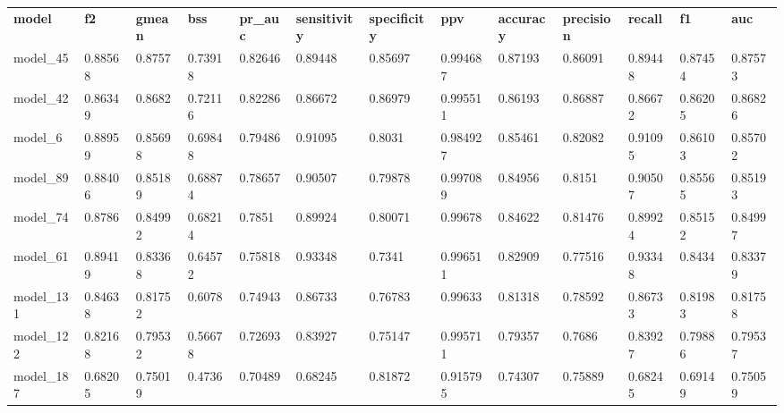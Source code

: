 \begin{tabular}{lllllllllllll}
\textbf{model} & \textbf{f2} & \textbf{gmean} & \textbf{bss} & \textbf{pr\_auc} & \textbf{sensitivity} & \textbf{specificity} & \textbf{ppv} & \textbf{accuracy} & \textbf{precision} & \textbf{recall} & \textbf{f1} & \textbf{auc} \\
model\_45      & 0.88568     & 0.8757         & 0.73918      & 0.82646          & 0.89448              & 0.85697              & 0.994687     & 0.87193           & 0.86091            & 0.89448         & 0.87454     & 0.87573      \\
model\_42      & 0.86349     & 0.8682         & 0.72116      & 0.82286          & 0.86672              & 0.86979              & 0.995511     & 0.86193           & 0.86887            & 0.86672         & 0.86205     & 0.86826      \\
model\_6       & 0.88959     & 0.85698        & 0.69848      & 0.79486          & 0.91095              & 0.8031               & 0.984927     & 0.85461           & 0.82082            & 0.91095         & 0.86103     & 0.85702      \\
model\_89      & 0.88406     & 0.85189        & 0.68874      & 0.78657          & 0.90507              & 0.79878              & 0.997089     & 0.84956           & 0.8151             & 0.90507         & 0.85565     & 0.85193      \\
model\_74      & 0.8786      & 0.84992        & 0.68214      & 0.7851           & 0.89924              & 0.80071              & 0.99678      & 0.84622           & 0.81476            & 0.89924         & 0.85152     & 0.84997      \\
model\_61      & 0.89419     & 0.83368        & 0.64572      & 0.75818          & 0.93348              & 0.7341               & 0.996511     & 0.82909           & 0.77516            & 0.93348         & 0.8434      & 0.83379      \\
model\_131     & 0.84638     & 0.81752        & 0.6078       & 0.74943          & 0.86733              & 0.76783              & 0.99633      & 0.81318           & 0.78592            & 0.86733         & 0.81983     & 0.81758      \\
model\_122     & 0.82168     & 0.79532        & 0.56678      & 0.72693          & 0.83927              & 0.75147              & 0.995711     & 0.79357           & 0.7686             & 0.83927         & 0.79886     & 0.79537      \\
model\_187     & 0.68205     & 0.75019        & 0.4736       & 0.70489          & 0.68245              & 0.81872              & 0.915795     & 0.74307           & 0.75889            & 0.68245         & 0.69149     & 0.75059      \\

\end{tabular}
